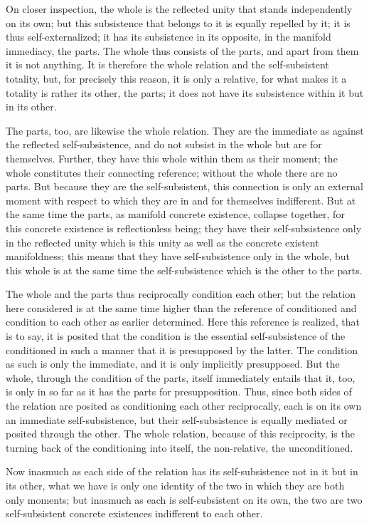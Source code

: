 On closer inspection,
the whole is the reflected unity
that stands independently on its own;
but this subsistence that belongs to it
is equally repelled by it;
it is thus self-externalized;
it has its subsistence in its opposite,
in the manifold immediacy, the parts.
The whole thus consists of the parts,
and apart from them it is not anything.
It is therefore the whole relation
and the self-subsistent totality,
but, for precisely this reason,
it is only a relative,
for what makes it a totality is
rather its other, the parts;
it does not have its subsistence
within it but in its other.

The parts, too, are likewise the whole relation.
They are the immediate as against
the reflected self-subsistence,
and do not subsist in the whole
but are for themselves.
Further, they have this whole within them as their moment;
the whole constitutes their connecting reference;
without the whole there are no parts.
But because they are the self-subsistent,
this connection is only an external moment
with respect to which they are
in and for themselves indifferent.
But at the same time the parts,
as manifold concrete existence, collapse together,
for this concrete existence is reflectionless being;
they have their self-subsistence
only in the reflected unity
which is this unity as well as
the concrete existent manifoldness;
this means that they have
self-subsistence only in the whole,
but this whole is at the same time the
self-subsistence which is the other to the parts.

The whole and the parts thus
reciprocally condition each other;
but the relation here considered is
at the same time higher than the
reference of conditioned and condition
to each other as earlier determined.
Here this reference is realized, that is to say,
it is posited that the condition is
the essential self-subsistence of the conditioned
in such a manner that it is presupposed by the latter.
The condition as such is only the immediate,
and it is only implicitly presupposed.
But the whole, through the condition of the parts,
itself immediately entails that it, too,
is only in so far as it has
the parts for presupposition.
Thus, since both sides of the relation
are posited as conditioning each other reciprocally,
each is on its own an immediate self-subsistence,
but their self-subsistence is equally
mediated or posited through the other.
The whole relation, because of this reciprocity,
is the turning back of the conditioning into itself,
the non-relative, the unconditioned.

Now inasmuch as each side of the relation has
its self-subsistence not in it but in its other,
what we have is only one identity of the two
in which they are both only moments;
but inasmuch as each is self-subsistent on its own,
the two are two self-subsistent concrete existences
indifferent to each other.

